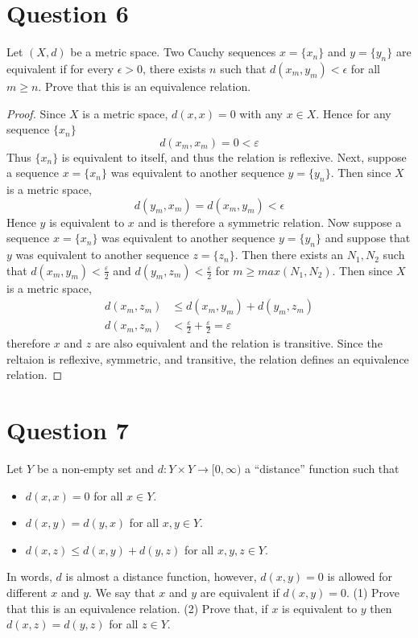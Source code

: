 \documentclass[12pt, letterpaper]{article}
\begin{document}
\section*{Question 6}
Let $(X,d)$ be a metric space.  Two Cauchy sequences $x=\{x_n\}$ and $y=\{y_n\}$ are equivalent if for every $\epsilon >0$, there exists $n$ such that
$d(x_m,y_m) < \epsilon$ for all $m\geq n$. Prove that this is an equivalence relation.

\begin{proof}
  Since $X$ is a metric space, $d(x, x) = 0$ with any $x \in X$. Hence for any sequence $\{x_n\}$
  $$ d(x_m, x_m) = 0 < \varepsilon$$
  Thus $\{x_n\}$ is equivalent to itself, and thus the relation is reflexive. Next, suppose a sequence $x=\{x_n\}$ was equivalent to another sequence $y=\{y_n\}$.
  Then since $X$ is a metric space,
  $$ d(y_m,x_m) = d(x_m, y_m)< \epsilon $$
  Hence $y$ is equivalent to $x$ and is therefore a symmetric relation. Now suppose a sequence $x=\{x_n\}$ was equivalent to another sequence $y=\{y_n\}$ and suppose that
  $y$ was equivalent to another sequence $z=\{z_n\}$. Then there exists an $N_1, N_2$ such that $d(x_m, y_m) < \frac{\varepsilon}{2}$ and $d(y_m, z_m) < \frac{\varepsilon}{2}$ for $m \geq max(N_1, N_2)$. Then since $X$ is a metric space,
  \begin{align*}
    d(x_m, z_m) &\leq d(x_m, y_m) + d(y_m, z_m)\\
    d(x_m, z_m) &< \frac{\varepsilon}{2} + \frac{\varepsilon}{2} = \varepsilon
  \end{align*}
  therefore $x$ and $z$ are also equivalent and the relation is transitive. Since the reltaion is reflexive, symmetric, and transitive, the relation defines an equivalence relation.
\end{proof}
\pagebreak
\section*{Question 7}
Let $Y$ be a non-empty set and $d: Y \times Y\rightarrow [0, \infty)$ a ``distance'' function such that
\begin{itemize}
\item $d(x,x)=0$  for all $x\in Y$.
\item $d(x,y)=d(y,x)$  for all $x,y\in Y$.
\item $d(x,z) \leq d(x,y) + d(y,z)$ for all $x,y,z\in Y$.
\end{itemize}
In words, $d$ is almost a distance function, however, $d(x,y)=0$ is allowed for different $x$ and $y$. We say that $x$ and $y$ are
equivalent if $d(x,y)=0$. (1) Prove that this is an equivalence relation. (2) Prove that, if $x$ is equivalent to $y$ then $d(x,z)=d(y,z)$ for all $z\in Y$.
\end{document}
